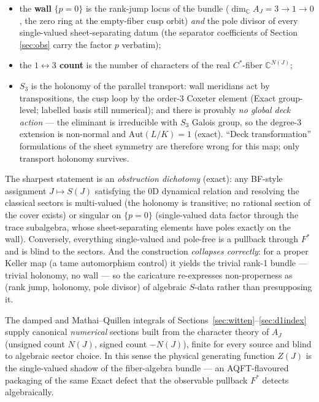 \documentclass[11pt]{article}
\theoremstyle{definition}
\theoremstyle{remark}
\newcommand{\C}{\mathbb{C}}
\begin{document}
\begin{itemize}
\item the \textbf{wall} $\{p=0\}$ is the rank-jump locus of the bundle
 ($\dim_\C A_J = 3\to1\to0$, the zero ring at the empty-fiber cusp
 orbit) \emph{and} the pole divisor of every single-valued
 sheet-separating datum (the separator coefficients of Section
 \ref{sec:obs} carry the factor $p$ verbatim);
\item the \textbf{$1\leftrightarrow3$ count} is the number of
 characters of the real $C^*$-fiber $\C^{N(J)}$;
\item \textbf{$S_3$} is the holonomy of the parallel transport: wall
 meridians act by transpositions, the cusp loop by the order-3
 Coxeter element (Exact group-level; labelled basis still numerical);
 and there is provably \emph{no global deck action} — the eliminant
 is irreducible with $S_3$ Galois group, so the degree-3 extension is
 non-normal and $\mathrm{Aut}(L/K)=1$ (exact). ``Deck
 transformation'' formulations of the sheet symmetry are therefore
 wrong for this map; only transport holonomy survives.
\end{itemize}

The sharpest statement is an \emph{obstruction dichotomy} (exact):
any BF-style assignment $J\mapsto S(J)$ satisfying the 0D dynamical
relation and resolving the classical sectors is multi-valued (the
holonomy is transitive; no rational section of the cover exists) or
singular on $\{p=0\}$ (single-valued data factor through the trace
subalgebra, whose sheet-separating elements have poles exactly on the
wall). Conversely, everything single-valued and pole-free is a
pullback through $F^*$ and is blind to the sectors. And the
construction \emph{collapses correctly}: for a proper Keller map (a
tame automorphism control) it yields the trivial rank-1 bundle —
trivial holonomy, no wall — so the caricature re-expresses
non-properness as (rank jump, holonomy, pole divisor) of algebraic
$S$-data rather than presupposing it.

The damped and Mathai--Quillen integrals of
Sections~\ref{sec:witten}--\ref{sec:d1index} supply canonical
\emph{numerical} sections built from the character theory of $A_J$
(unsigned count $N(J)$, signed count $-N(J)$), finite for every source
and blind to algebraic sector choice. In this sense the physical
generating function $Z(J)$ is the single-valued shadow of the
fiber-algebra bundle --- an AQFT-flavoured packaging of the same Exact
defect that the observable pullback $F^*$ detects algebraically.
\end{document}
